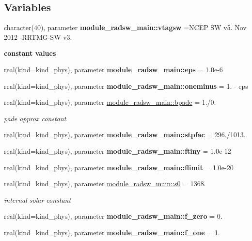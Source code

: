 \subsection*{Variables}
\begin{DoxyCompactItemize}
\item 
\mbox{\label{radsw__main_8f_a93334abce2ca8bfdcdfe5edd4ae1f093}} 
character(40), parameter {\bfseries module\+\_\+radsw\+\_\+main\+::vtagsw} =\textquotesingle{}N\+C\+EP SW v5. Nov 2012 -\/R\+R\+T\+MG-\/SW v3. \textquotesingle{}
\end{DoxyCompactItemize}
\begin{Indent}\textbf{ constant values}\par
\begin{DoxyCompactItemize}
\item 
real(kind=kind\+\_\+phys), parameter {\bfseries module\+\_\+radsw\+\_\+main\+::eps} = 1.\+0e-\/6
\item 
real(kind=kind\+\_\+phys), parameter {\bfseries module\+\_\+radsw\+\_\+main\+::oneminus} = 1. -\/ eps
\item 
real(kind=kind\+\_\+phys), parameter \hyperlink{group__module__radsw__main_gacd9ae7c14cbfdc55f1f0fff637ca0331}{module\+\_\+radsw\+\_\+main\+::bpade} = 1./0.
\begin{DoxyCompactList}\small\item\em pade approx constant \end{DoxyCompactList}\item 
real(kind=kind\+\_\+phys), parameter {\bfseries module\+\_\+radsw\+\_\+main\+::stpfac} = 296./1013.
\item 
real(kind=kind\+\_\+phys), parameter {\bfseries module\+\_\+radsw\+\_\+main\+::ftiny} = 1.\+0e-\/12
\item 
real(kind=kind\+\_\+phys), parameter {\bfseries module\+\_\+radsw\+\_\+main\+::flimit} = 1.\+0e-\/20
\item 
real(kind=kind\+\_\+phys), parameter \hyperlink{group__module__radsw__main_ga244c149eb05c0675a7e040dbf7e2bc4b}{module\+\_\+radsw\+\_\+main\+::s0} = 1368.
\begin{DoxyCompactList}\small\item\em internal solar constant \end{DoxyCompactList}\item 
real(kind=kind\+\_\+phys), parameter {\bfseries module\+\_\+radsw\+\_\+main\+::f\+\_\+zero} = 0.
\item 
real(kind=kind\+\_\+phys), parameter {\bfseries module\+\_\+radsw\+\_\+main\+::f\+\_\+one} = 1.
\end{DoxyCompactItemize}
\end{Indent}
